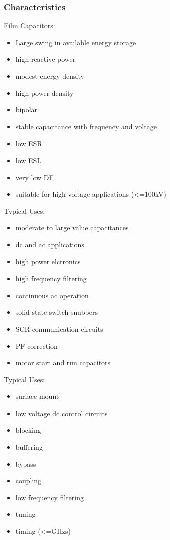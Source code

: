     \subsubsection{Characteristics}
        Film Capacitors:
        \begin{itemize}
            \item Large swing in available energy storage
            \item high reactive power
            \item modest energy density
            \item high power density
            \item bipolar
            \item stable capacitance with frequency and voltage
            \item low ESR
            \item low ESL
            \item very low DF
            \item suitable for high voltage applications (<=100kV)
        \end{itemize}

        Typical Uses:
        \begin{itemize}
            \item moderate to large value capacitances
            \item dc and ac applications
            \item high power elctronics
            \item high frequency filtering
            \item continuous ac operation
            \item solid state switch snubbers
            \item SCR communication circuits
            \item PF correction
            \item motor start and run capacitors
        \end{itemize}
        \cite{capRev}

        Typical Uses:
        \begin{itemize}
            \item surface mount
            \item low voltage dc control circuits
            \item blocking
            \item buffering
            \item bypass
            \item coupling
            \item low frequency filtering
            \item tuning
            \item timing (<=GHzs)
        \end{itemize}
        \cite{capRev}

